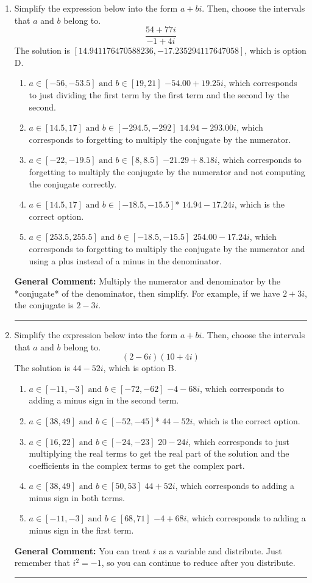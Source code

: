 \documentclass{extbook}[14pt]
\newcommand{\litem}[1]{\item#1\hspace*{-1cm}\rule{\textwidth}{0.4pt}}
\begin{document}
\begin{enumerate}\litem{
Simplify the expression below into the form $a+bi$. Then, choose the intervals that $a$ and $b$ belong to.
\[ \frac{54 + 77 i}{-1 + 4 i} \]
The solution is \( [14.941176470588236, -17.235294117647058] \), which is option D.\begin{enumerate}[label=\Alph*.]
\item \( a \in [-56, -53.5] \text{ and } b \in [19, 21] \) $-54.00  + 19.25 i$, which corresponds to just dividing the first term by the first term and the second by the second.
\item \( a \in [14.5, 17] \text{ and } b \in [-294.5, -292] \) $14.94  - 293.00 i$, which corresponds to forgetting to multiply the conjugate by the numerator.
\item \( a \in [-22, -19.5] \text{ and } b \in [8, 8.5] \) $-21.29  + 8.18 i$, which corresponds to forgetting to multiply the conjugate by the numerator and not computing the conjugate correctly.
\item \( a \in [14.5, 17] \text{ and } b \in [-18.5, -15.5] \)* $14.94  - 17.24 i$, which is the correct option.
\item \( a \in [253.5, 255.5] \text{ and } b \in [-18.5, -15.5] \) $254.00  - 17.24 i$, which corresponds to forgetting to multiply the conjugate by the numerator and using a plus instead of a minus in the denominator.
\end{enumerate}

\textbf{General Comment:} Multiply the numerator and denominator by the *conjugate* of the denominator, then simplify. For example, if we have $2+3i$, the conjugate is $2-3i$.
}
\litem{
Simplify the expression below into the form $a+bi$. Then, choose the intervals that $a$ and $b$ belong to.
\[ (2 - 6 i)(10 + 4 i) \]
The solution is \( 44 - 52 i \), which is option B.\begin{enumerate}[label=\Alph*.]
\item \( a \in [-11, -3] \text{ and } b \in [-72, -62] \) $-4 - 68 i$, which corresponds to adding a minus sign in the second term.
\item \( a \in [38, 49] \text{ and } b \in [-52, -45] \)* $44 - 52 i$, which is the correct option.
\item \( a \in [16, 22] \text{ and } b \in [-24, -23] \) $20 - 24 i$, which corresponds to just multiplying the real terms to get the real part of the solution and the coefficients in the complex terms to get the complex part.
\item \( a \in [38, 49] \text{ and } b \in [50, 53] \) $44 + 52 i$, which corresponds to adding a minus sign in both terms.
\item \( a \in [-11, -3] \text{ and } b \in [68, 71] \) $-4 + 68 i$, which corresponds to adding a minus sign in the first term.
\end{enumerate}

\textbf{General Comment:} You can treat $i$ as a variable and distribute. Just remember that $i^2=-1$, so you can continue to reduce after you distribute.
}
\end{enumerate}
\end{document}
